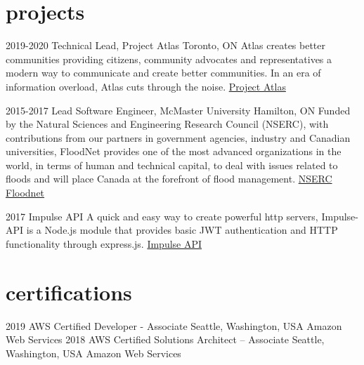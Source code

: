 \documentclass[]{cv}
\begin{document}
\pagebreak

\section{projects}

\begin{entrylist}
    \entry
        {2019-2020}
        {Technical Lead, Project Atlas}
        {Toronto, ON}
        {Atlas creates better communities providing citizens, community advocates and
        representatives a modern way to communicate and create better communities.
        In an era of information overload, Atlas cuts through the noise.
        \newline
        \newline
        \href{https://projectatlas.world}{Project Atlas}}
        \newline

    \entry
        {2015-2017}
        {Lead Software Engineer, McMaster University}
        {Hamilton, ON}
        {Funded by the Natural Sciences and Engineering Research Council (NSERC),
        with contributions from our partners in government agencies, industry and
        Canadian universities, FloodNet provides one of the most advanced organizations
        in the world, in terms of human and technical capital, to deal with issues
        related to floods and will place Canada at the forefront of flood management.
        \newline
        \newline
        \href{https://www.nsercfloodnet.ca/}{NSERC Floodnet}}
        \newline

    \entry
        {2017}
        {Impulse API}
        {}
        {A quick and easy way to create powerful http servers, Impulse-API is a Node.js module
        that provides basic JWT authentication and HTTP functionality through express.js.
        \newline
        \newline
        \href{https://www.npmjs.com/package/impulse-api}{Impulse API}}
\end{entrylist}

\section{certifications}

\begin{entrylist}
    \entry
        {2019}
        {AWS Certified Developer - Associate}
        {Seattle, Washington, USA}
        {Amazon Web Services}
    \entry
        {2018}
        {AWS Certified Solutions Architect – Associate}
        {Seattle, Washington, USA}
        {Amazon Web Services}
\end{entrylist}
\end{document}
